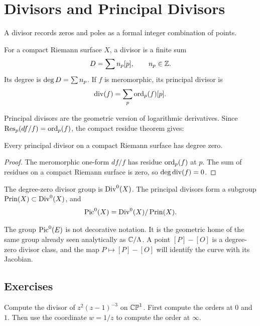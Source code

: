 \chapter{Divisors and Principal Divisors}
\label{ch:divisors}

A divisor records zeros and poles as a formal integer combination of points.

\begin{definition}
For a compact Riemann surface \(X\), a divisor is a finite sum
\[
  D=\sum n_p[p],\qquad n_p\in\mathbb{Z}.
\]
Its degree is \(\operatorname{deg} D=\sum n_p\).  If \(f\) is meromorphic, its principal
divisor is
\[
  \operatorname{div}(f)=\sum_p \operatorname{ord}_p(f)[p].
\]
\end{definition}

Principal divisors are the geometric version of logarithmic derivatives.  Since
\(\operatorname{Res}_p(df/f)=\operatorname{ord}_p(f)\), the compact residue theorem gives:

\begin{proposition}
\label{prop:principal-degree-zero}
Every principal divisor on a compact Riemann surface has degree zero.
\end{proposition}

\begin{proof}
The meromorphic one-form \(df/f\) has residue \(\operatorname{ord}_p(f)\) at \(p\).  The sum of
residues on a compact Riemann surface is zero, so
\(\operatorname{deg}\operatorname{div}(f)=0\).
\end{proof}

\begin{definition}
The degree-zero divisor group is \(\operatorname{Div}^0(X)\).  The principal divisors form a
subgroup \(\operatorname{Prin}(X)\subset\operatorname{Div}^0(X)\), and
\[
  \operatorname{Pic}^0(X)=\operatorname{Div}^0(X)/\operatorname{Prin}(X).
\]
\end{definition}

The group \(\operatorname{Pic}^0(E)\) is not decorative notation.  It is the geometric home of
the same group already seen analytically as \(\mathbb{C}/\Lambda\).  A point \([P]-[O]\)
is a degree-zero divisor class, and the map \(P\mapsto[P]-[O]\) will identify the
curve with its Jacobian.

\section*{Exercises}

\begin{exercise}
Compute the divisor of \(z^2(z-1)^{-3}\) on \(\mathbb{CP}^1\).  First compute the
orders at \(0\) and \(1\).  Then use the coordinate \(w=1/z\) to compute the
order at \(\infty\).
\end{exercise}

